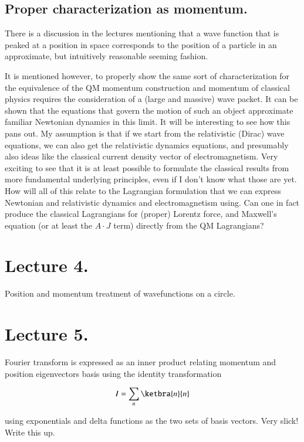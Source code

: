 \subsection{Proper characterization as momentum. }

There is a discussion in the lectures mentioning that a wave function that is peaked at a position in space
corresponds to the position of a particle in an approximate, but intuitively reasonable seeming fashion.

It is mentioned however, to properly show the same sort of characterization for the 
equivalence of the QM momentum construction and momentum of classical
physics requires the consideration of a (large and massive) wave packet.  It can be shown that the equations that
govern the motion
of such an object approximate familiar Newtonian dynamics in this limit.  It will be interesting to see how
this pans out.  My assumption is that if we start from the relativistic (Dirac) wave equations, we can also
get the relativistic dynamics equations, and presumably also ideas like the classical current density vector
of electromagnetism.  Very exciting to see that it is at least possible to formulate the classical results from
more fundamental underlying principles, even if I don't know what those are yet.  How will all of this relate 
to the Lagrangian formulation that we can express Newtonian and relativistic dynamics and electromagnetism using.
Can one in fact produce the classical Lagrangians for (proper) Lorentz force, and Maxwell's equation (or at least the $A \cdot J$ term) directly from the QM Lagrangians?

\section{Lecture 4. }

Position and momentum treatment of wavefunctions on a circle. 

\section{Lecture 5. }

Fourier transform is expressed as an inner product relating momentum and 
position eigenvectors basis using the identity transformation

\begin{align*}
I = \sum_n \ketbra{n}{n}
\end{align*}

using exponentials and delta functions as the two sets of basis vectors.  Very
slick!  Write this up.

%
%

%

